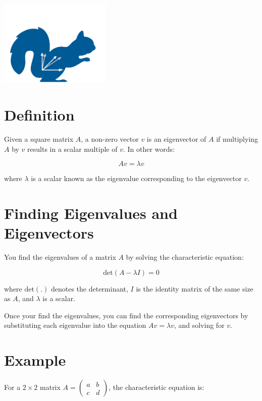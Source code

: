 \includegraphics[width=0.4\textwidth]{overlaysquirrel.png}


\section{Definition}

Given a square matrix $A$, a non-zero vector $v$ is an eigenvector of
$A$ if multiplying $A$ by $v$ results in a scalar multiple of $v$. In other words:

\begin{equation}
Av = \lambda v
\end{equation}

where $\lambda$ is a scalar known as the eigenvalue corresponding to the eigenvector $v$.

\section{Finding Eigenvalues and Eigenvectors}

You find the eigenvalues of a matrix $A$  by solving the characteristic equation:

\begin{equation}
\text{det}(A - \lambda I) = 0
\end{equation}

where $\text{det}(.)$ denotes the determinant, $I$ is the identity
matrix of the same size as $A$, and $\lambda$ is a scalar.

Once your find the eigenvalues, you can find the corresponding eigenvectors by substituting each eigenvalue into the equation $Av = \lambda
v$, and solving for $v$.

\section{Example}

For a $2 \times 2$ matrix $A = \begin{pmatrix} a & b \\ c &
  d \end{pmatrix}$, the characteristic equation is:

